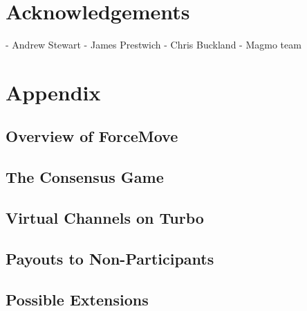 \documentclass{article}
\theoremstyle{definition}
\begin{document}
\section{Acknowledgements}

- Andrew Stewart
- James Prestwich
- Chris Buckland
- Magmo team


\section{Appendix}

\subsection{Overview of ForceMove}
\subsection{The Consensus Game}
\subsection{Virtual Channels on Turbo}
\subsection{Payouts to Non-Participants}
\subsection{Possible Extensions}
\end{document}
